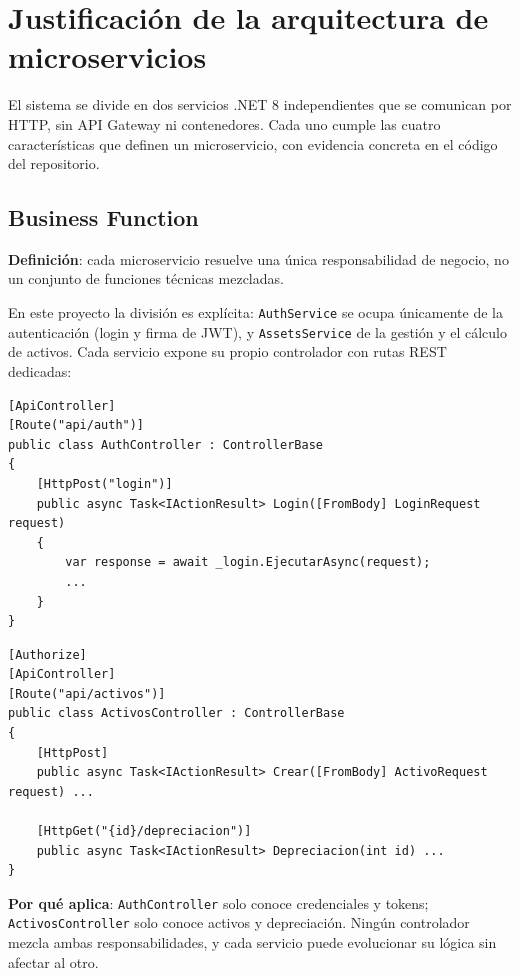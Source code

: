 \documentclass[11pt,a4paper]{article}
\begin{document}
\section{Justificación de la arquitectura de microservicios}

El sistema se divide en dos servicios .NET 8 independientes que se comunican
por HTTP, sin API Gateway ni contenedores. Cada uno cumple las cuatro
características que definen un microservicio, con evidencia concreta en el
código del repositorio.

\subsection{Business Function}

\textbf{Definición}: cada microservicio resuelve una única responsabilidad de
negocio, no un conjunto de funciones técnicas mezcladas.

En este proyecto la división es explícita: \texttt{AuthService} se ocupa
únicamente de la autenticación (login y firma de JWT), y
\texttt{AssetsService} de la gestión y el cálculo de activos. Cada servicio
expone su propio controlador con rutas REST dedicadas:

\begin{lstlisting}[style=csharp, caption={AuthService.Api/Controllers/AuthController.cs (fragmento)}]
[ApiController]
[Route("api/auth")]
public class AuthController : ControllerBase
{
    [HttpPost("login")]
    public async Task<IActionResult> Login([FromBody] LoginRequest request)
    {
        var response = await _login.EjecutarAsync(request);
        ...
    }
}
\end{lstlisting}

\begin{lstlisting}[style=csharp, caption={AssetsService.Api/Controllers/ActivosController.cs (fragmento)}]
[Authorize]
[ApiController]
[Route("api/activos")]
public class ActivosController : ControllerBase
{
    [HttpPost]
    public async Task<IActionResult> Crear([FromBody] ActivoRequest request) ...

    [HttpGet("{id}/depreciacion")]
    public async Task<IActionResult> Depreciacion(int id) ...
}
\end{lstlisting}

\textbf{Por qué aplica}: \texttt{AuthController} solo conoce credenciales y
tokens; \texttt{ActivosController} solo conoce activos y depreciación. Ningún
controlador mezcla ambas responsabilidades, y cada servicio puede evolucionar
su lógica sin afectar al otro.
\end{document}
